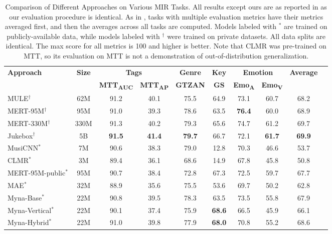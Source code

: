 \begin{table*}[h]
\centering
\begin{tabular}{lccccccccc}
\toprule
\textbf{Approach} & \textbf{Size} & \multicolumn{2}{c}{\textbf{Tags}} & \textbf{Genre} & \textbf{Key} & \multicolumn{2}{c}{\textbf{Emotion}} & \textbf{Average} \\
                  &                     & \textbf{MTT\textsubscript{AUC}} & \textbf{MTT\textsubscript{AP}} & \textbf{GTZAN} & \textbf{GS} & \textbf{Emo\textsubscript{A}} & \textbf{Emo\textsubscript{V}} &  \\
\midrule
\midrule
MULE$^{\dagger}$             & 62M                 & 91.2 & 40.1 & 75.5 & 64.9 & 73.1 & 60.7 & 68.2 \\
MERT-95M$^{\dagger}$         & 95M                 & 91.0 & 39.3 & 78.6 & 63.5 & \textbf{76.4} & 60.0 & 68.9 \\
MERT-330M$^{\dagger}$        & 330M                & 91.3 & 40.2 & 79.3 & 65.6 & 74.7 & 61.2 & 69.7 \\
Jukebox$^{\dagger}$          & 5B                  & \textbf{91.5} & \textbf{41.4} & \textbf{79.7} & 66.7 & 72.1 & \textbf{61.7} & \textbf{69.9} \\
MusiCNN$^{\ast}$          & 7M                  & 90.6 & 38.3 & 79.0 & 12.8 & 70.3 & 46.6 & 53.7 \\
CLMR$^{\ast}$             & 3M                  & 89.4 & 36.1 & 68.6 & 14.9 & 67.8 & 45.8 & 50.8 \\
MERT-95M-public$^{\ast}$  & 95M                 & 90.7 & 38.4 & 72.8 & 67.3 & 72.5 & 59.7 & 67.7 \\
MAE$^{\ast}$  & 32M                  & 88.9 & 35.6 & 75.5 & 53.6 & 69.7 & 50.2 & 62.8 \\
\midrule
Myna-Base$^{\ast}$        & 22M                 & 90.8 & 39.5 & 78.3 & 63.5 & 73.5 & 55.8 & 67.9 \\
Myna-Vertical$^{\ast}$    & 22M                 & 90.1 & 37.4 & 75.9 & \textbf{68.6} & 66.5 & 45.9 & 66.1 \\
Myna-Hybrid$^{\ast}$      & 22M                 & 91.0 & 39.8 & 77.9 & \textbf{68.0} & 70.8 & 55.2 & 68.6 \\
\bottomrule
\end{tabular}
\caption{Comparison of Different Approaches on Various MIR Tasks. All results except ours are as reported in \cite{JukeMIR, MERT} as our evaluation procedure is identical. As in \cite{JukeMIR}, tasks with multiple evaluation metrics have their metrics averaged first, and then the averages across all tasks are computed. Models labeled with $^{\ast}$ are trained on publicly-available data, while models labeled with $^{\dagger}$ were trained on private datasets. All data splits are identical. The max score for all metrics is 100 and higher is better. Note that CLMR was pre-trained on MTT, so its evaluation on MTT is not a demonstration of out-of-distribution generalization.}
\end{table*}
